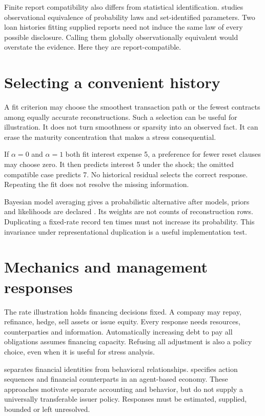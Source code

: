 Finite report compatibility also differs from statistical identification. \citet[Sections 2.1--2.3]{giacomini2021} studies observational equivalence of probability laws and set-identified parameters. Two loan histories fitting supplied reports need not induce the same law of every possible disclosure. Calling them globally observationally equivalent would overstate the evidence. Here they are report-compatible.

\section{Selecting a convenient history}
A fit criterion may choose the smoothest transaction path or the fewest contracts among equally accurate reconstructions. Such a selection can be useful for illustration. It does not turn smoothness or sparsity into an observed fact. It can erase the maturity concentration that makes a stress consequential.

If $\alpha=0$ and $\alpha=1$ both fit interest expense 5, a preference for fewer reset clauses may choose zero. It then predicts interest 5 under the shock; the omitted compatible case predicts 7. No historical residual selects the correct response. Repeating the fit does not resolve the missing information.

Bayesian model averaging gives a probabilistic alternative after models, priors and likelihoods are declared \citep{hoeting1999}. Its weights are not counts of reconstruction rows. Duplicating a fixed-rate record ten times must not increase its probability. This invariance under representational duplication is a useful implementation test.

\section{Mechanics and management responses}
The rate illustration holds financing decisions fixed. A company may repay, refinance, hedge, sell assets or issue equity. Every response needs resources, counterparties and information. Automatically increasing debt to pay all obligations assumes financing capacity. Refusing all adjustment is also a policy choice, even when it is useful for stress analysis.

\citet{shahnazarian2004} separates financial identities from behavioral relationships. \citet{caiani2016} specifies action sequences and financial counterparts in an agent-based economy. These approaches motivate separate accounting and behavior, but do not supply a universally transferable issuer policy. Responses must be estimated, supplied, bounded or left unresolved.

